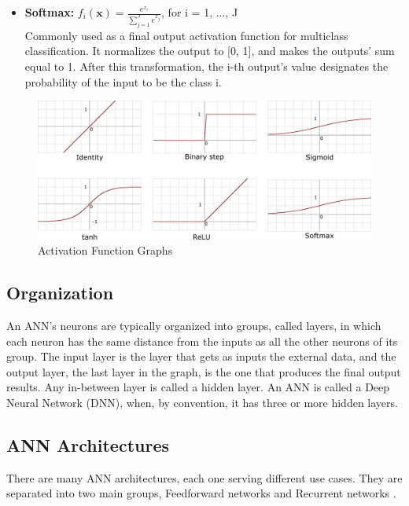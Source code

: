 \begin{itemize}
	\item \textbf{Softmax:} $
		      f_i(\textbf{x}) = \frac{
		      e^{x_i}
		      }{
		      \sum_{j=1}^{J}e^{x_j}
		      }
		  $, for i = 1, ..., J\\
		  Commonly used as a final output activation function for multiclass classification. It normalizes the output to [0, 1], and makes the outputs' sum equal to 1. After this transformation, the i-th output's value designates the probability of the input to be the class i.
\end{itemize}

\begin{figure} [ht]
	\centering
	\includegraphics[width=\textwidth]{Images/Activation_functions.png}
	\decoRule
	\caption[Activation Function Graphs]{Activation Function Graphs}
	\label{fig:activation-functions}
\end{figure}

\subsection{Organization}
An ANN's neurons are typically organized into groups, called layers, in which each neuron has the same distance from the inputs as all the other neurons of its group. The input layer is the layer that gets as inputs the external data, and the output layer, the last layer in the graph, is the one that produces the final output results. Any in-between layer is called a hidden layer. An ANN is called a Deep Neural Network (DNN), when, by convention, it has three or more hidden layers.

\subsection{ANN Architectures}
There are many ANN architectures, each one serving different use cases. They are separated into two main groups, Feedforward networks and Recurrent networks \cite{Types-of-Artificial-Neural-Networks}.

